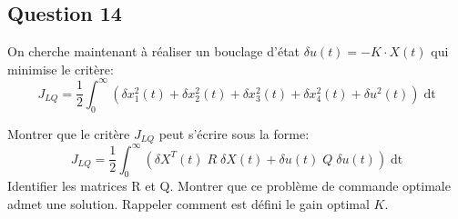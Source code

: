 \documentclass[class=article, crop=false]{standalone}
\begin{document}
\subsection{Question 14}
On cherche maintenant à réaliser un bouclage d'état $\delta u(t) = -K \cdot X(t)$ qui minimise le critère:
\begin{equation}
    J_{LQ} = \frac{1}{2} \int^{\infty}_{0}
    ( \delta x^2_1(t) + \delta x^2_2(t) + \delta x^2_3(t) + \delta x^2_4(t) + \delta u^2(t)) \; \text{dt}
\end{equation}
\begin{exercise}
    Montrer que le critère $J_{LQ}$ peut s'écrire sous la forme:
    \begin{equation}
        J_{LQ} = \frac{1}{2} \int^{\infty}_{0}
        ( \delta X^T(t) \; R \; \delta X(t) + \delta u(t) \; Q \; \delta u(t)) \; \text{dt}
    \end{equation}
    Identifier les matrices R et Q. Montrer que ce problème de commande optimale admet une solution. Rappeler comment est défini le gain optimal $K$.
\end{exercise}
\end{document}
